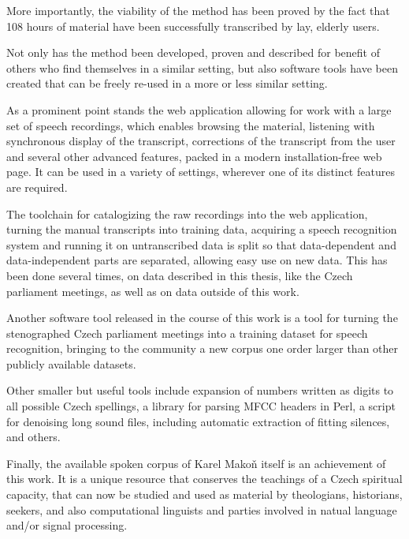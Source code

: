 \documentclass[12pt,a4paper]{report}
\begin{document}
More importantly, the viability of the method has been proved by the fact that
108 hours of material have been successfully transcribed by lay, elderly users.

Not only has the method been developed, proven and described for benefit of
others who find themselves in a similar setting, but also software tools have
been created that can be freely re-used in a more or less similar setting.

As a
prominent point stands the web application allowing for work with a large set of
speech recordings, which enables browsing the material, listening with
synchronous display of the transcript, corrections of the transcript from the
user and several other advanced features, packed in a modern installation-free
web page.
It can be used in a variety of settings, wherever one of its distinct features
are required.

The toolchain for catalogizing the raw recordings into the web application,
turning the manual transcripts into training data, acquiring a speech
recognition system and running it on untranscribed data is split so
that data-dependent and data-independent parts are separated, allowing easy use
on new data. This has been done several times, on data described in this thesis,
like the Czech parliament meetings, as well as on data outside of this work.

Another software tool released in the course of this work is a tool for
turning the stenographed Czech parliament meetings into a training dataset for
speech recognition, bringing to the community a new corpus one order larger than other publicly
available datasets.

Other smaller but useful tools include expansion of numbers written as digits to
all possible Czech spellings, a library for parsing MFCC headers in Perl, a
script for denoising long sound files, including automatic extraction of
fitting silences, and others.

Finally, the available spoken corpus of Karel Makoň itself is an achievement of
this work. It is a unique resource that conserves the teachings of a Czech
spiritual capacity, that can now be studied and used as material by theologians,
historians, seekers, and also computational linguists and parties involved in
natual language and/or signal processing.

\renewcommand{\bibname}{References}


\end{document}
